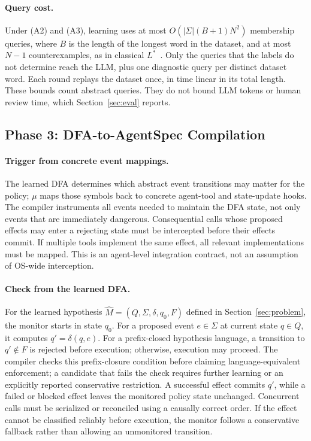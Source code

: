 \paragraph{Query cost.}
Under (A2) and (A3), learning uses at most $O(|\Sigma|(B+1)N^2)$ membership queries, where $B$ is the length of the longest word in the dataset, and at most $N-1$ counterexamples, as in classical $L^*$~\cite{angluin1987learning}. Only the queries that the labels do not determine reach the LLM, plus one diagnostic query per distinct dataset word. Each round replays the dataset once, in time linear in its total length. These bounds count abstract queries. They do not bound LLM tokens or human review time, which Section~\ref{sec:eval} reports.

\subsection{Phase 3: DFA-to-AgentSpec Compilation}\label{sec:compile}
\paragraph{Trigger from concrete event mappings.}
The learned DFA determines which abstract event transitions may matter for the policy; $\mu$ maps those symbols back to concrete agent-tool and state-update hooks. The compiler instruments all events needed to maintain the DFA state, not only events that are immediately dangerous. Consequential calls whose proposed effects may enter a rejecting state must be intercepted before their effects commit. If multiple tools implement the same effect, all relevant implementations must be mapped. This is an agent-level integration contract, not an assumption of OS-wide interception.

\paragraph{Check from the learned DFA.}
For the learned hypothesis $\widehat M=(Q,\Sigma,\delta,q_0,F)$ defined in Section~\ref{sec:problem}, the monitor starts in state $q_0$. For a proposed event $e\in\Sigma$ at current state $q\in Q$, it computes $q'=\delta(q,e)$. For a prefix-closed hypothesis language, a transition to $q'\notin F$ is rejected before execution; otherwise, execution may proceed. The compiler checks this prefix-closure condition before claiming language-equivalent enforcement; a candidate that fails the check requires further learning or an explicitly reported conservative restriction. A successful effect commits $q'$, while a failed or blocked effect leaves the monitored policy state unchanged. Concurrent calls must be serialized or reconciled using a causally correct order. If the effect cannot be classified reliably before execution, the monitor follows a conservative fallback rather than allowing an unmonitored transition.

